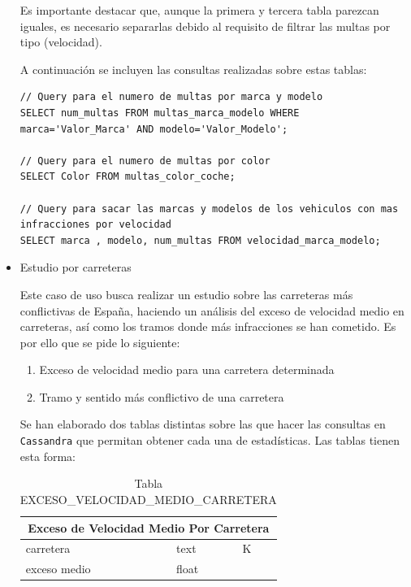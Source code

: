 \documentclass[]{article}
\begin{document}
\begin{itemize}
    Es importante destacar que, aunque la primera y tercera tabla parezcan iguales, es necesario separarlas debido al requisito de filtrar las multas por tipo (velocidad). 

    A continuación se incluyen las consultas realizadas sobre estas tablas:

    \lstset{style=cql}
    \begin{lstlisting}[language=cql, caption=Querys para el caso de uso 1]
// Query para el numero de multas por marca y modelo
SELECT num_multas FROM multas_marca_modelo WHERE marca='Valor_Marca' AND modelo='Valor_Modelo';

// Query para el numero de multas por color
SELECT Color FROM multas_color_coche;

// Query para sacar las marcas y modelos de los vehiculos con mas infracciones por velocidad
SELECT marca , modelo, num_multas FROM velocidad_marca_modelo;
    \end{lstlisting}

    \item Estudio por carreteras

    Este caso de uso busca realizar un estudio sobre las carreteras más conflictivas de España, haciendo un análisis del exceso de velocidad medio en carreteras, así como los tramos donde más infracciones se han cometido. Es por ello que se pide lo siguiente:

    \begin{enumerate}
        \item Exceso de velocidad medio para una carretera determinada
        \item Tramo y sentido más conflictivo de una carretera 
    \end{enumerate}

    Se han elaborado dos tablas distintas sobre las que hacer las consultas en \texttt{Cassandra} que permitan obtener cada una de estadísticas. Las tablas tienen esta forma:  

    \begin{table}[H]
        \centering
        \begin{tabular}{lll} 
            \toprule
            \multicolumn{3}{c}{\large\textbf{Exceso de Velocidad Medio Por Carretera}} \\ 
            \midrule
            carretera      & text & K\\
            exceso medio     & float & \\
            \bottomrule
        \end{tabular}
        \caption {Tabla EXCESO\_VELOCIDAD\_MEDIO\_CARRETERA}
    \end{table}


\end{itemize}
\end{document}
